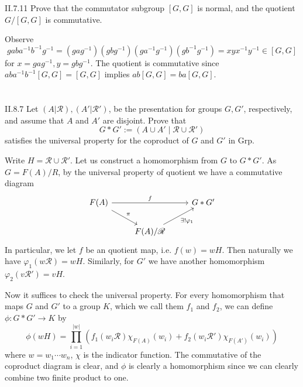 \begin{problem}{II.7.11}
Prove that the commutator subgroup $[G,G]$ is normal, and the quotient $G/[G,G]$ is commutative.
\end{problem}
\begin{pf}
Observe
\[
gaba^{-1}b^{-1}g^{-1} = (gag^{-1})(gbg^{-1})(ga^{-1}g^{-1})(gb^{-1}g^{-1}) = xyx^{-1}y^{-1} \in [G,G]
\]
for $x = gag^{-1}, y = gbg^{-1}$. The quotient is commutative since $aba^{-1}b^{-1}[G,G] = [G,G]$ implies $ab[G,G] = ba[G,G]$.
\end{pf}

\section{}

\begin{problem}{II.8.7}
Let $(A|\mathscr{R}), (A'|\mathscr{R'})$, be the presentation for groups $G, G'$, respectively, and assume that $A$ and $A'$ are disjoint. Prove that
\[
G * G' := (A \cup A' \; |\; \mathscr{R} \cup \mathscr{R'})
\]
satisfies the universal property for the coproduct of $G$ and $G'$ in \textsf{Grp}.
\end{problem}
\begin{pf} Write $H = \mathscr{R} \cup \mathscr{R'}$. Let us construct a homomorphism from $G$ to $G * G'$. As $G = F(A)/R$, by the universal property of quotient we have a commutative diagram
\[
\begin{tikzcd}
F(A) \arrow[rr, "f"] \arrow[rd, "\pi"] &                                                   & G * G' \\
& F(A)/\mathscr{R} \arrow[ru, "\exists!\varphi_1"'] &       
\end{tikzcd}
\]
In particular, we let $f$ be an quotient map, i.e. $f(w) = wH$. Then naturally we have $\varphi_1(w\mathscr{R}) = wH$. Similarly, for $G'$ we have another homomorphism $\varphi_2(v\mathscr{R}') = vH$.

Now it suffices to check the universal property. For every homomorphism that maps $G$ and $G'$ to a group $K$, which we call them $f_1$ and $f_2$, we can define $\phi : G * G' \to K$ by
\[ 
\phi(wH) = \prod_{i = 1}^{|w|} \left( f_1(w_i\mathscr{R}) \chi_{F(A)}(w_i) +  f_2(w_i\mathscr{R}') \chi_{F(A')}(w_i) \right)
\]
where $w = w_1 \cdots w_n$, $\chi$ is the indicator function. The commutative of the coproduct diagram is clear, and $\phi$ is clearly a homomorphism since we can clearly combine two finite product to one.
\end{pf}

